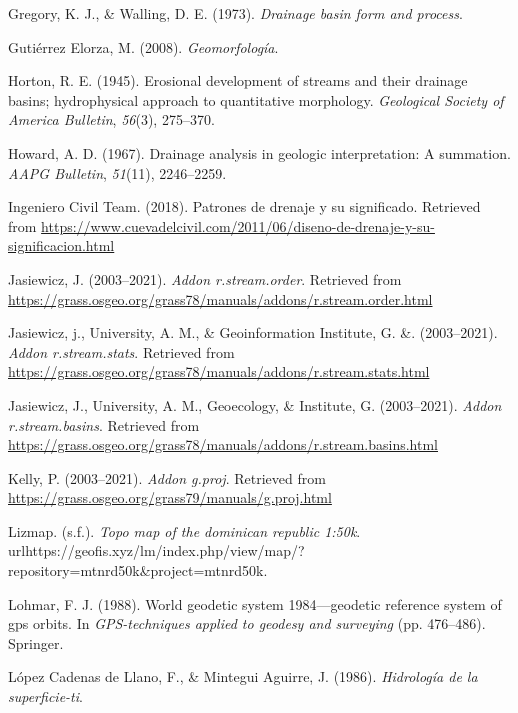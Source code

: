 \documentclass[11pt,]{article}
\begin{document}
\hypertarget{ref-gregory1973drainage}{}
Gregory, K. J., \& Walling, D. E. (1973). \emph{Drainage basin form and
process}.

\hypertarget{ref-gutierrez2008geomorfologia}{}
Gutiérrez Elorza, M. (2008). \emph{Geomorfología}.

\hypertarget{ref-horton1945erosional}{}
Horton, R. E. (1945). Erosional development of streams and their
drainage basins; hydrophysical approach to quantitative morphology.
\emph{Geological Society of America Bulletin}, \emph{56}(3), 275--370.

\hypertarget{ref-howard1967drainage}{}
Howard, A. D. (1967). Drainage analysis in geologic interpretation: A
summation. \emph{AAPG Bulletin}, \emph{51}(11), 2246--2259.

\hypertarget{ref-patron2018}{}
Ingeniero Civil Team. (2018). Patrones de drenaje y su significado.
Retrieved from
\url{https://www.cuevadelcivil.com/2011/06/diseno-de-drenaje-y-su-significacion.html}

\hypertarget{ref-streamorder}{}
Jasiewicz, J. (2003--2021). \emph{Addon r.stream.order}. Retrieved from
\url{https://grass.osgeo.org/grass78/manuals/addons/r.stream.order.html}

\hypertarget{ref-streamstats}{}
Jasiewicz, j., University, A. M., \& Geoinformation Institute, G. \&.
(2003--2021). \emph{Addon r.stream.stats}. Retrieved from
\url{https://grass.osgeo.org/grass78/manuals/addons/r.stream.stats.html}

\hypertarget{ref-streambasinsjareck}{}
Jasiewicz, J., University, A. M., Geoecology, \& Institute, G.
(2003--2021). \emph{Addon r.stream.basins}. Retrieved from
\url{https://grass.osgeo.org/grass78/manuals/addons/r.stream.basins.html}

\hypertarget{ref-gproj}{}
Kelly, P. (2003--2021). \emph{Addon g.proj}. Retrieved from
\url{https://grass.osgeo.org/grass79/manuals/g.proj.html}

\hypertarget{ref-TopoMap}{}
Lizmap. (s.f.). \emph{Topo map of the dominican republic 1:50k}.
urlhttps://geofis.xyz/lm/index.php/view/map/?repository=mtnrd50k\&project=mtnrd50k.

\hypertarget{ref-lohmar1988world}{}
Lohmar, F. J. (1988). World geodetic system 1984---geodetic reference
system of gps orbits. In \emph{GPS-techniques applied to geodesy and
surveying} (pp. 476--486). Springer.

\hypertarget{ref-lopez1986hidrologia}{}
López Cadenas de Llano, F., \& Mintegui Aguirre, J. (1986).
\emph{Hidrología de la superficie-ti}.
\end{document}

